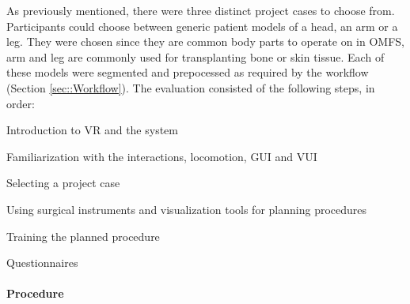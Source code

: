 As previously mentioned, there were three distinct project cases to choose from.
Participants could choose between generic patient models of a head, an arm or a leg.
They were chosen since they are common body parts to operate on in OMFS, arm and leg are commonly used for transplanting bone or skin tissue.
Each of these models were segmented and prepocessed as required by the workflow (Section \ref{sec::Workflow}).
The evaluation consisted of the following steps, in order:

\begin{compactenum}[label=(\alph*)]
    \item Introduction to VR and the system
    \item Familiarization with the interactions, locomotion, GUI and VUI
    \item Selecting a project case
    \item Using surgical instruments and visualization tools for planning procedures
    \item Training the planned procedure 
    \item Questionnaires
\end{compactenum}

\paragraph{\textbf{Procedure}}

